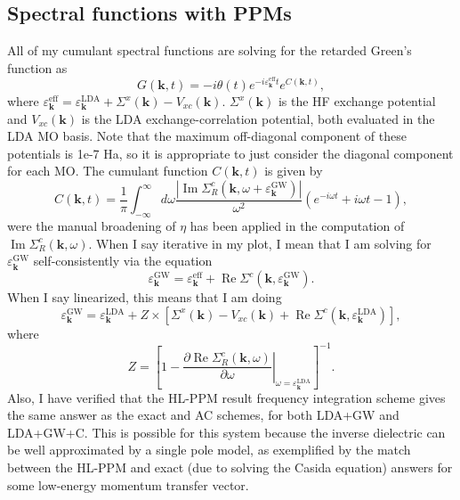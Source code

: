 \subsection{Spectral functions with PPMs}
All of my cumulant spectral functions are solving for the retarded Green's function as
\begin{equation}
G(\mathbf{k}, t)=-i \theta(t) e^{-i \varepsilon_{\bm{k}}^{\text{eff}} t} e^{C(\mathbf{k}, t)},
\end{equation}
where $\varepsilon_{\bm{k}}^{\text{eff}}=\varepsilon_{\bm{k}}^{\text{LDA}}+\Sigma^x(\mathbf{k})-V_{xc}(\mathbf{k})$. $\Sigma^x(\mathbf{k})$ is the HF exchange potential and $V_{xc}(\mathbf{k})$ is the LDA exchange-correlation potential, both evaluated in the LDA MO basis. Note that the maximum off-diagonal component of these potentials is 1e-7 Ha, so it is appropriate to just consider the diagonal component for each MO. The cumulant function $C(\mathbf{k}, t)$ is given by
\begin{equation}
C(\mathbf{k}, t)= \frac{1}{\pi} \int_{-\infty}^{\infty} d \omega \frac{|\operatorname{Im} \Sigma_R^c(\mathbf{k}, \omega + \varepsilon_{\bm{k}}^{\text{GW}})|}{\omega^2}\left(e^{-i \omega t}+i \omega t-1\right),
\end{equation}
were the manual broadening of $\eta$ has been applied in the computation of $\operatorname{Im} \Sigma_R^c(\mathbf{k}, \omega)$.
When I say iterative in my plot, I mean that I am solving for $\varepsilon_{\bm{k}}^{\text{GW}}$ self-consistently via the equation
\begin{equation}
\varepsilon_{\bm{k}}^{\text{GW}} = \varepsilon_{\bm{k}}^{\text{eff}} + \operatorname{Re} \Sigma^c(\mathbf{k}, \varepsilon_{\bm{k}}^{\text{GW}}).
\end{equation}
When I say linearized, this means that I am doing
\begin{equation}
\varepsilon_{\bm{k}}^{\text{GW}} = \varepsilon_{\bm{k}}^{\text{LDA}} + Z \times \left[\Sigma^x(\mathbf{k}) - V_{xc}(\mathbf{k}) + \operatorname{Re} \Sigma^c(\mathbf{k}, \varepsilon_{\bm{k}}^{\text{LDA}})\right],
\end{equation}
where
\begin{equation}
Z = \left[1 - \left.\frac{\partial \operatorname{Re} \Sigma_R^c(\mathbf{k}, \omega)}{\partial \omega}\right|_{\omega = \varepsilon_{\bm{k}}^{\text{LDA}}}\right]^{-1}.
\end{equation}
Also, I have verified that the HL-PPM result frequency integration scheme gives the same answer as the exact and AC schemes, for both LDA+GW and LDA+GW+C. This is possible for this system because the inverse dielectric can be well approximated by a single pole model, as exemplified by the match between the HL-PPM and exact (due to solving the Casida equation) answers for some low-energy momentum transfer vector.
